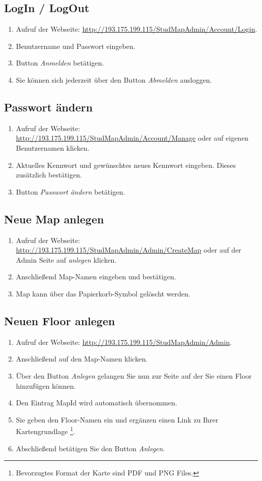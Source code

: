 \subsection*{LogIn / LogOut}
\begin{enumerate}
\item Aufruf der Webseite: \href{URL}{http://193.175.199.115/StudMapAdmin/Account/Login}.
\item Benutzername und Passwort eingeben.
\item Button \textit{Anmelden} betätigen.
\item Sie können sich jederzeit über den Button \textit{Abmelden} ausloggen.
\end{enumerate}

\subsection*{Passwort ändern}
\begin{enumerate}
\item Aufruf der Webseite: \href{URL}{http://193.175.199.115/StudMapAdmin/Account/Manage} oder auf eigenen Benutzernamen klicken.
\item Aktuelles Kennwort und gewünschtes neues Kennwort eingeben. Dieses zusätzlich bestätigen.
\item Button \textit{Passwort ändern} betätigen.
\end{enumerate}

\subsection*{Neue Map anlegen}
\begin{enumerate}
\item Aufruf der Webseite: \href{URL}{http://193.175.199.115/StudMapAdmin/Admin/CreateMap} oder auf der Admin Seite auf \textit{anlegen} klicken.
\item Anschließend Map-Namen eingeben und bestätigen.
\item Map kann über das Papierkorb-Symbol gelöscht werden.
\end{enumerate}

\subsection*{Neuen Floor anlegen}
\begin{enumerate}
\item Aufruf der Webseite: \href{URL}{http://193.175.199.115/StudMapAdmin/Admin}. 
\item Anschließend auf den Map-Namen klicken.
\item Über den Button \textit{Anlegen} gelangen Sie nun zur Seite auf der Sie einen Floor hinzufügen können.
\item Den Eintrag MapId wird automatisch übernommen.
\item Sie geben den Floor-Namen ein und ergänzen einen Link zu Ihrer Kartengrundlage \footnote{Bevorzugtes Format der Karte sind PDF und PNG Files.}.
\item Abschließend betätigen Sie den Button \textit{Anlegen}.
\end{enumerate}

